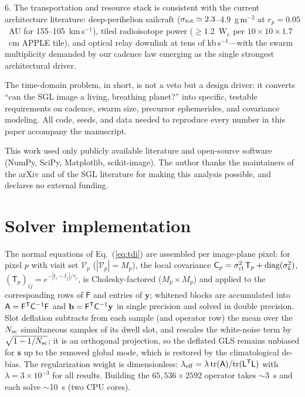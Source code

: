 ﻿\documentclass[twocolumn]{emulateapj}
\begin{document}
6. The transportation and resource stack is consistent with the
current architecture literature: deep-perihelion sailcraft
($\sigma_{\rm tot}\simeq2.3$--4.9~g\,m$^{-2}$ at $r_p=0.05$~AU for
155--105~km\,s$^{-1}$), tiled radioisotope power ($\ge$1.2~W$_e$ per
$10\times10\times1.7$~cm APPLE tile), and optical relay downlink at
tens of kb\,s$^{-1}$---with the swarm multiplicity demanded by our
cadence law emerging as the single strongest architectural driver.

The time-domain problem, in short, is not a veto but a design driver:
it converts ``can the SGL image a living, breathing planet?'' into
specific, testable requirements on cadence, swarm size, precursor
ephemerides, and covariance modeling. All code, seeds, and data needed
to reproduce every number in this paper accompany the manuscript.

\acknowledgments
This work used only publicly available literature and open-source
software (NumPy, SciPy, Matplotlib, scikit-image). The author thanks
the maintainers of the arXiv and of the SGL literature for making this
analysis possible, and declares no external funding.

\appendix

\section{Solver implementation}
\label{app:solver}
The normal equations of Eq.~(\ref{eq:tdi}) are assembled per
image-plane pixel: for pixel $p$ with visit set $\mathcal{V}_p$
($|\mathcal{V}_p|=M_p$), the local covariance
$\mathsf{C}_p=\sigma_{\rm cl}^2\,\mathsf{T}_p+
\mathrm{diag}(\sigma_k^2)$,
$(\mathsf{T}_p)_{ij}=e^{-|t_i-t_j|/\tau_c}$, is Cholesky-factored
($M_p\times M_p$) and applied to the corresponding rows of
$\mathsf{F}$ and entries of $\mathbf{y}$; whitened blocks are
accumulated into
$\mathsf{A}=\mathsf{F}^{\sf T}\mathsf{C}^{-1}\mathsf{F}$ and
$\mathbf{b}=\mathsf{F}^{\sf T}\mathsf{C}^{-1}\mathbf{y}$ in single
precision and solved in double precision. Slot deflation subtracts from
each sample (and operator row) the mean over the $N_{\rm sc}$
simultaneous samples of its dwell slot, and rescales the white-noise
term by $\sqrt{1-1/N_{\rm sc}}$; it is an orthogonal projection, so the
deflated GLS remains unbiased for $\mathbf{s}$ up to the removed global
mode, which is restored by the climatological de-bias. The
regularization weight is dimensionless:
$\lambda_{\rm eff}=\lambda\,\mathrm{tr}(\mathsf{A})/
\mathrm{tr}(\mathsf{L}^{\sf T}\mathsf{L})$ with $\lambda=3\times10^{-3}$
for all results. Building the $65{,}536\times2592$ operator takes
$\sim$3~s and each solve $\sim$10~s (two CPU cores).
\end{document}
